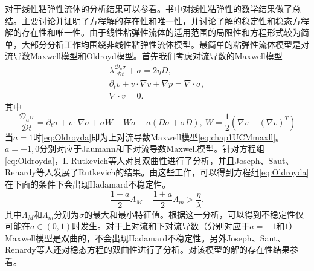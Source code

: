 对于线性粘弹性流体的分析结果可以参看\cite{fabrizio1992mathematical,renardy2000mathematical}。书中对线性粘弹性的数学结果做了总结。主要讨论并证明了方程解的存在性和唯一性，并讨论了解的稳定性和稳态方程解的存在性和唯一性。由于线性粘弹性流体的适用范围的局限性和方程形式较为简单，大部分分析工作均围绕非线性粘弹性流体模型。最简单的粘弹性流体模型是对流导数Maxwell模型和Oldroyd模型。首先我们考虑对流导数的Maxwell模型
\begin{subequations}\label{eq:Oldroyda}
\begin{align}
	\lambda \frac{\mathcal{D}_a \sigma}{\mathcal{D} t} + \sigma = 2 \eta D, \\
	\partial_t v + v \cdot \nabla v  + \nabla p = \nabla \cdot \sigma, \\
	\nabla \cdot v = 0.
\end{align}
\end{subequations}
其中
\begin{equation}\label{eq:convectderivative}
	\frac{\mathcal{D}_a \sigma}{\mathcal{D} t} = \partial_t \sigma + v \cdot \nabla \sigma + \sigma W- W \sigma - a(D \sigma + \sigma D), \ W = \frac{1}{2}(\nabla v - (\nabla v)^T)
\end{equation}
当$a=1$时\eqref{eq:Oldroyda}即为上对流导数Maxwell模型\eqref{eq:chap1UCMmaxll}。$a=-1,0$分别对应于Jaumann和下对流导数Maxwell模型。针对方程组\eqref{eq:Oldroyda}，I. Rutkevich等人对其双曲性进行了分析\cite{rutkevich1969some,rutkevich1970propagation}，并且Joseph、Saut、Renardy等人发展了Rutkevich的结果\cite{joseph1987hyperbolicity,joseph1986change}。由这些工作，可以得到方程组\eqref{eq:Oldroyda}在下面的条件下会出现Hadamard不稳定性。
\begin{equation*}
	\frac{1-a}{2} \Lambda_M - \frac{1+a}{2} \Lambda_m > \frac{\eta}{\lambda}.
\end{equation*}
其中$\Lambda_M$和$\Lambda_m$分别为$\sigma$的最大和最小特征值。根据这一分析，可以得到不稳定性仅可能在$a\in (0,1)$时发生。对于上对流和下对流导数（分别对应于$a=-1$和$1$）Maxwell模型是双曲的，不会出现Hadamard不稳定性。另外Joseph、Saut、Renardy等人还对稳态方程的双曲性进行了分析。对该模型的解的存在性结果参看\cite{saut2012lectures}。


